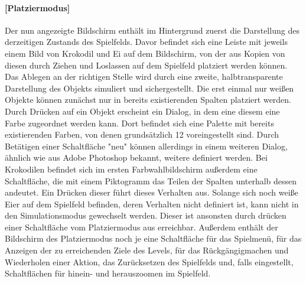 \paragraph{{[}Platziermodus{]}}
Der nun angezeigte Bildschirm enthält im Hintergrund zuerst die Darstellung
des derzeitigen Zustands des Spielfelds. Davor befindet sich eine Leiste 
mit jeweils einem Bild von Krokodil und Ei auf dem Bildschirm, von der aus 
Kopien von diesen durch Ziehen und Loslassen auf dem Spielfeld platziert
werden können. Das Ablegen an der richtigen Stelle wird durch eine zweite, 
halbtransparente Darstellung des Objekts simuliert und sichergestellt. 
Die erst einmal nur weißen Objekte können zunächst nur in bereits 
existierenden Spalten platziert werden. Durch Drücken auf ein Objekt erscheint 
ein Dialog, in dem eine diesem eine Farbe zugeordnet werden kann.
Dort befindet sich eine Palette mit bereits existierenden Farben, von denen 
grundsätzlich 12 voreingestellt sind. Durch Betätigen einer Schaltfläche
"neu" können allerdings in einem weiteren Dialog, ähnlich wie aus Adobe 
Photoshop bekannt, weitere definiert werden. Bei Krokodilen befindet sich
im ersten Farbwahlbildschirm außerdem eine Schaltfläche, die mit einem
Piktogramm das Teilen der Spalten unterhalb dessen andeutet. Ein Drücken
dieser führt dieses Verhalten aus.
\newline
Solange sich noch weiße Eier auf dem Spielfeld befinden, deren Verhalten
nicht definiert ist, kann nicht in den Simulationsmodus gewechselt werden.
Dieser ist ansonsten durch drücken einer Schaltfläche vom Platziermodus
aus erreichbar.
\newline
Außerdem enthält der Bildschirm des Platziermodus noch je eine Schaltfläche
für das Spielmenü, für das Anzeigen der zu erreichenden Ziele des Levels, 
für das Rückgängigmachen und Wiederholen einer Aktion, das Zurücksetzen
des Spielfelds und, falls eingestellt, Schaltflächen für hinein- und 
herauszoomen im Spielfeld.
\newline
\newline
